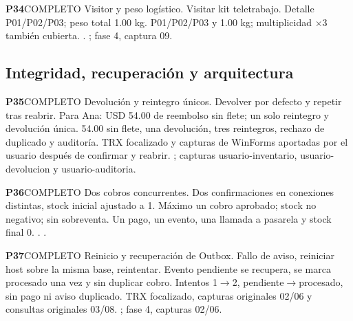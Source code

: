 \par\medskip\noindent\begin{minipage}{\linewidth}
\noindent\textbf{\large P34}\quad\textsf{COMPLETO}
 Visitor y peso logístico.
 Visitar kit teletrabajo.
 Detalle P01/P02/P03; peso total 1.00 kg.
 P01/P02/P03 y 1.00 kg; multiplicidad $\times$3 también cubierta.
 . ; fase 4, captura 09.
\end{minipage}\par
\subsection*{Integridad, recuperación y arquitectura}
\par\medskip\noindent\begin{minipage}{\linewidth}
\noindent\textbf{\large P35}\quad\textsf{COMPLETO}
 Devolución y reintegro únicos.
 Devolver por defecto y repetir tras reabrir.
 Para Ana: USD 54.00 de reembolso sin flete; un solo reintegro y devolución única.
 54.00 sin flete, una devolución, tres reintegros, rechazo de duplicado y auditoría.
 TRX focalizado y capturas de WinForms aportadas por el usuario después de confirmar y reabrir. ; capturas usuario-inventario, usuario-devolucion y usuario-auditoria.
\end{minipage}\par
\par\medskip\noindent\begin{minipage}{\linewidth}
\noindent\textbf{\large P36}\quad\textsf{COMPLETO}
 Dos cobros concurrentes.
 Dos confirmaciones en conexiones distintas, stock inicial ajustado a 1.
 Máximo un cobro aprobado; stock no negativo; sin sobreventa.
 Un pago, un evento, una llamada a pasarela y stock final 0.
 . .
\end{minipage}\par
\par\medskip\noindent\begin{minipage}{\linewidth}
\noindent\textbf{\large P37}\quad\textsf{COMPLETO}
 Reinicio y recuperación de Outbox.
 Fallo de aviso, reiniciar host sobre la misma base, reintentar.
 Evento pendiente se recupera, se marca procesado una vez y sin duplicar cobro.
 Intentos 1$\to$2, pendiente$\to$procesado, sin pago ni aviso duplicado.
 TRX focalizado, capturas originales 02/06 y consultas originales 03/08. ; fase 4, capturas 02/06.
\end{minipage}\par
